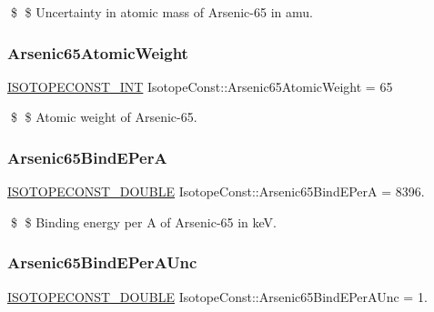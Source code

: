 \$ \$ Uncertainty in atomic mass of Arsenic-\/65 in amu. \mbox{\label{group___isotope_const-_arsenic-_as65_ga5bd5c5e0cf44c606674f719273b10c09}} 
\subsubsection{\texorpdfstring{Arsenic65\+Atomic\+Weight}{Arsenic65AtomicWeight}}
{\footnotesize\ttfamily \mbox{\hyperlink{group___isotope_const-_macros_ga5f18360b3e99483a35c32d789e62621c}{I\+S\+O\+T\+O\+P\+E\+C\+O\+N\+S\+T\+\_\+\+I\+NT}} Isotope\+Const\+::\+Arsenic65\+Atomic\+Weight = 65}

\$ \$ Atomic weight of Arsenic-\/65. \mbox{\label{group___isotope_const-_arsenic-_as65_gae7dca58cdc464eb018ceb739cf511cd3}} 
\subsubsection{\texorpdfstring{Arsenic65\+Bind\+E\+PerA}{Arsenic65BindEPerA}}
{\footnotesize\ttfamily \mbox{\hyperlink{group___isotope_const-_macros_ga8f45a7272ce02c0b4c65c44636ed719a}{I\+S\+O\+T\+O\+P\+E\+C\+O\+N\+S\+T\+\_\+\+D\+O\+U\+B\+LE}} Isotope\+Const\+::\+Arsenic65\+Bind\+E\+PerA = 8396.}

\$ \$ Binding energy per A of Arsenic-\/65 in keV. \mbox{\label{group___isotope_const-_arsenic-_as65_ga04ac2e9864906675b1be487e093d3692}} 
\subsubsection{\texorpdfstring{Arsenic65\+Bind\+E\+Per\+A\+Unc}{Arsenic65BindEPerAUnc}}
{\footnotesize\ttfamily \mbox{\hyperlink{group___isotope_const-_macros_ga8f45a7272ce02c0b4c65c44636ed719a}{I\+S\+O\+T\+O\+P\+E\+C\+O\+N\+S\+T\+\_\+\+D\+O\+U\+B\+LE}} Isotope\+Const\+::\+Arsenic65\+Bind\+E\+Per\+A\+Unc = 1.}

